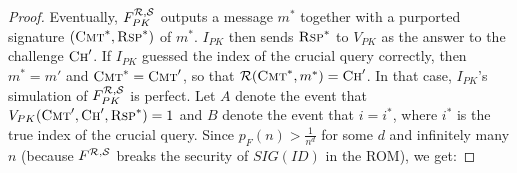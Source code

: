 \begin{proof}
Eventually, $F^{\mathcal{R},\mathcal{S}}_{PK}$ outputs a message $m^*$ together with a
purported signature $(\textsc{Cmt}^*,\\ \textsc{Rsp}^*)$ of $m^*$.  $I_{PK}$ then
sends $\textsc{Rsp}^*$ to $V_{PK}$ as the answer to the challenge
$\textsc{Ch}'$. If $I_{PK}$ guessed the index of the crucial query correctly,
then $m^* = m'$ and $\textsc{Cmt}^* = \textsc{Cmt}'$, so that
$\mathcal{R}(\textsc{Cmt}^*,m^*) = \textsc{Ch}'$. In that case, $I_{PK}$'s
simulation of $F^{\mathcal{R},\mathcal{S}}_{PK}$ is perfect. 
Let $A$ denote the event that 
$V_{PK}(\textsc{Cmt}',\textsc{Ch}',\textsc{Rsp}^*) = 1$ and $B$ denote
the event that $i=i^*$, where $i^*$ is the true index of the crucial query. 
Since
$p_F(n) > \frac{1}{n^d}$ for some $d$ and infinitely many $n$ (because
$F^{\mathcal{R},\mathcal{S}}$ breaks the security of $SIG(ID)$ in the ROM), we get:

\end{proof}
